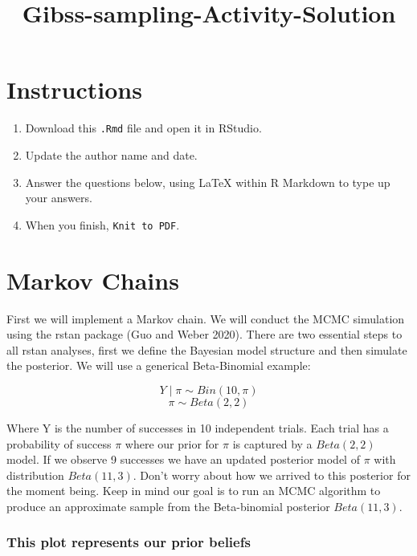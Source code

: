 \documentclass[
]{article}
\title{Gibss-sampling-Activity-Solution}
\author{}
\date{\vspace{-2.5em}}
\begin{document}
\maketitle

\hypertarget{instructions}{%
\section{Instructions}\label{instructions}}

\begin{enumerate}
\def\labelenumi{\arabic{enumi}.}
\item
  Download this \texttt{.Rmd} file and open it in RStudio.
\item
  Update the author name and date.
\item
  Answer the questions below, using LaTeX within R Markdown to type up
  your answers.
\item
  When you finish, \texttt{Knit\ to\ PDF}.
\end{enumerate}

\hypertarget{markov-chains}{%
\section{Markov Chains}\label{markov-chains}}

First we will implement a Markov chain. We will conduct the MCMC
simulation using the rstan package (Guo and Weber 2020). There are two
essential steps to all rstan analyses, first we define the Bayesian
model structure and then simulate the posterior. We will use a generical
Beta-Binomial example:

\[Y\mid \pi \sim Bin(10,\pi)\] \[\pi \sim Beta(2,2)\]

Where Y is the number of successes in 10 independent trials. Each trial
has a probability of success \(\pi\) where our prior for \(\pi\) is
captured by a \(Beta(2,2)\) model. If we observe 9 successes we have an
updated posterior model of \(\pi\) with distribution \(Beta(11,3)\).
Don't worry about how we arrived to this posterior for the moment being.
Keep in mind our goal is to run an MCMC algorithm to produce an
approximate sample from the Beta-binomial posterior \(Beta(11,3)\).

\hypertarget{this-plot-represents-our-prior-beliefs}{%
\subsubsection{This plot represents our prior
beliefs}\label{this-plot-represents-our-prior-beliefs}}
\end{document}
